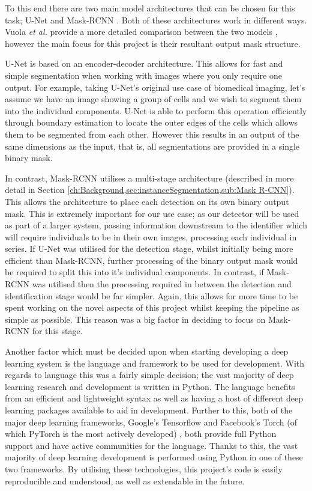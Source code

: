 To this end there are two main model architectures that can be chosen for this task; U-Net \cite{ronneberger_u-net_2015} and Mask-RCNN \cite{he_mask_2017}. Both of these architectures work in different ways. Vuola \textit{et al.} provide a more detailed comparison between the two models \cite{vuola_mask-rcnn_2019}, however the main focus for this project is their resultant output mask structure. 

U-Net is based on an encoder-decoder architecture. This allows for fast and simple segmentation when working with images where you only require one output. For example, taking U-Net's original use case of biomedical imaging, let's assume we have an image showing a group of cells and we wish to segment them into the individual components. U-Net is able to perform this operation efficiently through boundary estimation to locate the outer edges of the cells which allows them to be segmented from each other. However this results in an output of the same dimensions as the input, that is, all segmentations are provided in a single binary mask. 

In contrast, Mask-RCNN utilises a multi-stage architecture (described in more detail in Section \ref{ch:Background,sec:instanceSegmentation,sub:Mask R-CNN}). This allows the architecture to place each detection on its own binary output mask. This is extremely important for our use case; as our detector will be used as part of a larger system, passing information downstream to the identifier which will require individuals to be in their own images, processing each individual in series. If U-Net was utilised for the detection stage, whilst initially being more efficient than Mask-RCNN, further processing of the binary output mask would be required to split this into it's individual components. In contrast, if Mask-RCNN was utilised then the processing required in between the detection and identification stage would be far simpler. Again, this allows for more time to be spent working on the novel aspects of this project whilst keeping the pipeline as simple as possible. This reason was a big factor in deciding to focus on Mask-RCNN for this stage.

Another factor which must be decided upon when starting developing a deep learning system is the language and framework to be used for development. With regards to language this was a fairly simple decision; the vast majority of deep learning research and development is written in Python. The language benefits from an efficient and lightweight syntax as well as having a host of different deep learning packages available to aid in development. Further to this, both of the major deep learning frameworks, Google's Tensorflow \cite{abadi_tensorflow:_2016} and Facebook's Torch (of which PyTorch is the most actively developed) \cite{paszke_automatic_2017}, both provide full Python support and have active communities for the language. Thanks to this, the vast majority of deep learning development is performed using Python in one of these two frameworks. By utilising these technologies, this project's code is easily reproducible and understood, as well as extendable in the future.

